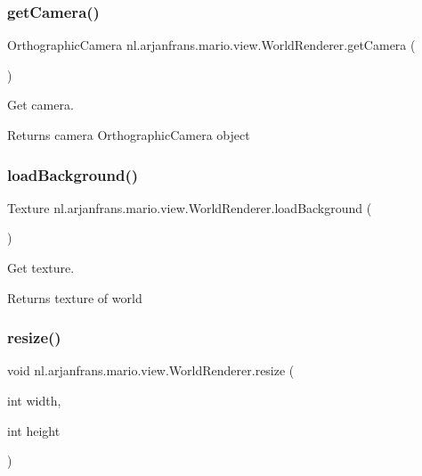 \subsubsection{\texorpdfstring{get\+Camera()}{getCamera()}}
{\footnotesize\ttfamily Orthographic\+Camera nl.\+arjanfrans.\+mario.\+view.\+World\+Renderer.\+get\+Camera (\begin{DoxyParamCaption}{ }\end{DoxyParamCaption})}



Get camera. 

\begin{DoxyReturn}{Returns}
camera Orthographic\+Camera object 
\end{DoxyReturn}
\mbox{\label{classnl_1_1arjanfrans_1_1mario_1_1view_1_1WorldRenderer_a43f69b3995ab2dc9c82a7c9f78f58821}} 
\subsubsection{\texorpdfstring{load\+Background()}{loadBackground()}}
{\footnotesize\ttfamily Texture nl.\+arjanfrans.\+mario.\+view.\+World\+Renderer.\+load\+Background (\begin{DoxyParamCaption}{ }\end{DoxyParamCaption})\hspace{0.3cm}{\ttfamily [private]}}



Get texture. 

\begin{DoxyReturn}{Returns}
texture of world 
\end{DoxyReturn}
\mbox{\label{classnl_1_1arjanfrans_1_1mario_1_1view_1_1WorldRenderer_a10dcf6ac3ca6c2591648eb560fabb98e}} 
\subsubsection{\texorpdfstring{resize()}{resize()}}
{\footnotesize\ttfamily void nl.\+arjanfrans.\+mario.\+view.\+World\+Renderer.\+resize (\begin{DoxyParamCaption}\item[{int}]{width,  }\item[{int}]{height }\end{DoxyParamCaption})}



